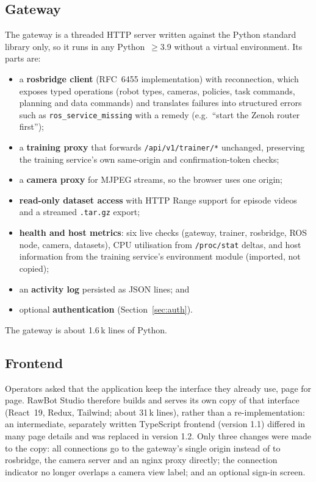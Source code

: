 \documentclass[conference]{IEEEtran}
\begin{document}
\subsection{Gateway}
The gateway is a threaded HTTP server written against the Python standard library only, so it
runs in any Python~$\geq$3.9 without a virtual environment. Its parts are:
\begin{itemize}
\item a \textbf{rosbridge client} (RFC~6455 implementation) with reconnection, which exposes typed
operations (robot types, cameras, policies, task commands, planning and data commands) and
translates failures into structured errors such as \texttt{ros\_service\_missing} with a remedy
(e.g.\ ``start the Zenoh router first'');
\item a \textbf{training proxy} that forwards \texttt{/api/v1/trainer/*} unchanged, preserving the
training service's own same-origin and confirmation-token checks;
\item a \textbf{camera proxy} for MJPEG streams, so the browser uses one origin;
\item \textbf{read-only dataset access} with HTTP Range support for episode videos and a streamed
\texttt{.tar.gz} export;
\item \textbf{health and host metrics}: six live checks (gateway, trainer, rosbridge, ROS node,
camera, datasets), CPU utilisation from \texttt{/proc/stat} deltas, and host information from
the training service's environment module (imported, not copied);
\item an \textbf{activity log} persisted as JSON lines; and
\item optional \textbf{authentication} (Section~\ref{sec:auth}).
\end{itemize}
The gateway is about 1.6\,k lines of Python.

\subsection{Frontend}
Operators asked that the application keep the interface they already use, page for page. RawBot Studio
therefore builds and serves its own copy of that interface (React~19, Redux, Tailwind; about
31\,k lines), rather than a re-implementation: an intermediate, separately written TypeScript
frontend (version 1.1) differed in many page details and was replaced in version 1.2. Only
three changes were made to the copy: all connections go to the gateway's single origin instead
of to rosbridge, the camera server and an nginx proxy directly; the connection indicator no
longer overlaps a camera view label; and an optional sign-in screen.
\end{document}
